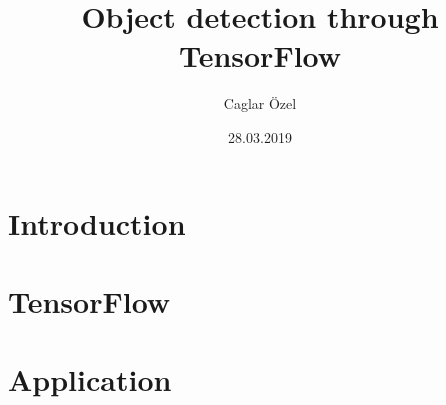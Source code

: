 \documentclass[12pt]{beamer}
\title[]{Object detection through TensorFlow}
\author{Caglar Özel}
\institute{HTW Berlin}
\date{28.03.2019}
\begin{document}
\begin{frame}
    \titlepage
\end{frame}

\begin{frame}
    \tableofcontents
\end{frame}

\section{Introduction}


\section{TensorFlow}


\section{Application}

\end{document}
